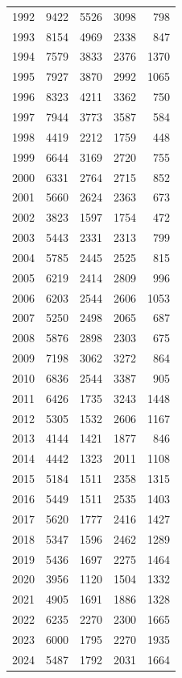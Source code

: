 \documentclass[
]{scrartcl}
\begin{document}
\begin{longtable}[]{@{}rrrrr@{}}
1992 & 9422 & 5526 & 3098 & 798 \\
1993 & 8154 & 4969 & 2338 & 847 \\
1994 & 7579 & 3833 & 2376 & 1370 \\
1995 & 7927 & 3870 & 2992 & 1065 \\
1996 & 8323 & 4211 & 3362 & 750 \\
1997 & 7944 & 3773 & 3587 & 584 \\
1998 & 4419 & 2212 & 1759 & 448 \\
1999 & 6644 & 3169 & 2720 & 755 \\
2000 & 6331 & 2764 & 2715 & 852 \\
2001 & 5660 & 2624 & 2363 & 673 \\
2002 & 3823 & 1597 & 1754 & 472 \\
2003 & 5443 & 2331 & 2313 & 799 \\
2004 & 5785 & 2445 & 2525 & 815 \\
2005 & 6219 & 2414 & 2809 & 996 \\
2006 & 6203 & 2544 & 2606 & 1053 \\
2007 & 5250 & 2498 & 2065 & 687 \\
2008 & 5876 & 2898 & 2303 & 675 \\
2009 & 7198 & 3062 & 3272 & 864 \\
2010 & 6836 & 2544 & 3387 & 905 \\
2011 & 6426 & 1735 & 3243 & 1448 \\
2012 & 5305 & 1532 & 2606 & 1167 \\
2013 & 4144 & 1421 & 1877 & 846 \\
2014 & 4442 & 1323 & 2011 & 1108 \\
2015 & 5184 & 1511 & 2358 & 1315 \\
2016 & 5449 & 1511 & 2535 & 1403 \\
2017 & 5620 & 1777 & 2416 & 1427 \\
2018 & 5347 & 1596 & 2462 & 1289 \\
2019 & 5436 & 1697 & 2275 & 1464 \\
2020 & 3956 & 1120 & 1504 & 1332 \\
2021 & 4905 & 1691 & 1886 & 1328 \\
2022 & 6235 & 2270 & 2300 & 1665 \\
2023 & 6000 & 1795 & 2270 & 1935 \\
2024 & 5487 & 1792 & 2031 & 1664 \\

\end{longtable}
\end{document}
